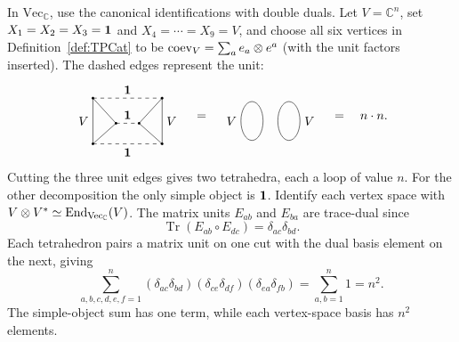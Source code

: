 \documentclass{amsart}
\begin{document}
\begin{example}\label{ex:toy-TPE}
In $\mathrm{Vec}_{\mathbb C}$, use the canonical identifications with double duals. Let $V=\mathbb C^n$, set $X_1=X_2=X_3={\bf 1}$ and $X_4=\cdots=X_9=V$, and choose all six vertices in Definition~\ref{def:TPCat} to be $\mathrm{coev}_V=\sum_a e_a\otimes e^a$ (with the unit factors inserted). The dashed edges represent the unit:
\[
\begin{tikzpicture}[baseline=.7cm,scale=.65]
\draw (0,0)--(0,2)--(1,.9)--cycle;
\draw (3,0)--(3,2)--(2,.9)--cycle;
\draw[dashed] (0,0)--(3,0) node[midway,below] {$\one$};
\draw[dashed] (0,2)--(3,2) node[midway,above] {$\one$};
\draw[dashed] (1,.9)--(2,.9) node[midway,above] {$\one$};
\node[left] at (0,1) {$V$}; \node[right] at (3,1) {$V$};
\foreach \p in {(0,0),(0,2),(1,.9),(3,0),(3,2),(2,.9)}
  \fill \p circle[radius=1.6pt];
\end{tikzpicture}
\quad=\quad
\begin{tikzpicture}[baseline=.7cm,scale=.65]
\draw (0,1) ellipse (.48 and .85); \node[left] at (-.48,1) {$V$};
\draw (1.6,1) ellipse (.48 and .85); \node[right] at (2.08,1) {$V$};
\end{tikzpicture}
\quad=\quad n\cdot n.
\]
Cutting the three unit edges gives two tetrahedra, each a loop of value $n$.
For the other decomposition the only simple object is ${\bf 1}$.
Identify each vertex space with $V\otimes V^*\simeq\mathrm{End}_{\mathrm{Vec}_{\mathbb C}}(V)$.
The matrix units $E_{ab}$ and $E_{ba}$ are trace-dual since
\[
 \operatorname{Tr}(E_{ab}\circ E_{dc})=\delta_{ac}\delta_{bd}.
\]
Each tetrahedron pairs a matrix unit on one cut with the dual basis element on the next, giving
\[
 \sum_{a,b,c,d,e,f=1}^n
    (\delta_{ac}\delta_{bd})
    (\delta_{ce}\delta_{df})
    (\delta_{ea}\delta_{fb})
 =\sum_{a,b=1}^n1=n^2.
\]
The simple-object sum has one term, while each vertex-space basis has $n^2$ elements.
\end{example}
\end{document}
